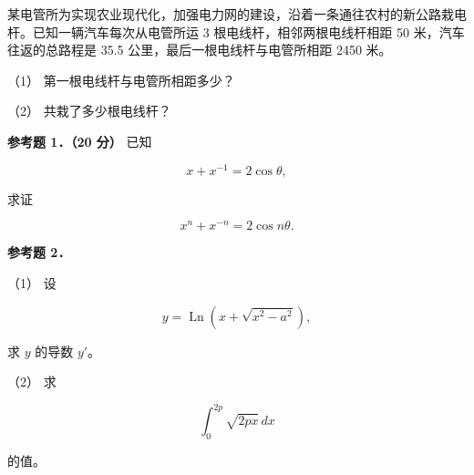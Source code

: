 \begin{question}
某电管所为实现农业现代化，加强电力网的建设，沿着一条通往农村的新公路栽电杆。已知一辆汽车每次从电管所运 3 根电线杆，相邻两根电线杆相距 50 米，汽车往返的总路程是 35.5 公里，最后一根电线杆与电管所相距 2450 米。

（1） 第一根电线杆与电管所相距多少？

（2） 共栽了多少根电线杆？

\textbf{参考题 1．（20 分）} 已知

\nopagebreak[4]
\[
x+x^{-1}=2\cos\theta,
\]

求证

\nopagebreak[4]
\[
x^n+x^{-n}=2\cos n\theta.
\]

\textbf{参考题 2．}

（1） 设

\nopagebreak[4]
\[
y=\operatorname{Ln}\left(x+\sqrt{x^2-a^2}\right),
\]

求 $y$ 的导数 $y'$。

（2） 求

\nopagebreak[4]
\[
\int_0^{2p}\sqrt{2px}\,dx
\]

的值。

\end{question}